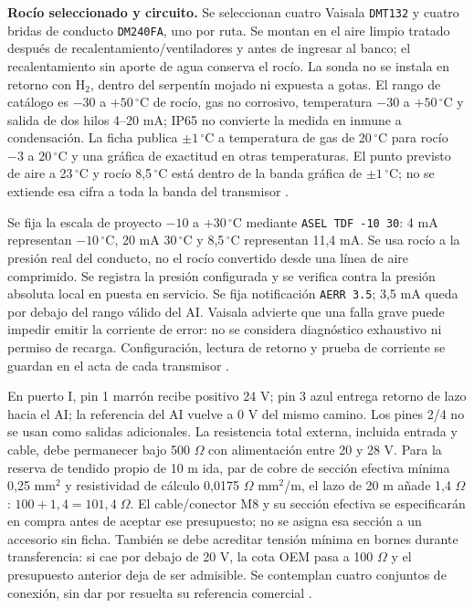 \textbf{Rocío seleccionado y circuito.} Se seleccionan cuatro Vaisala \texttt{DMT132} y cuatro bridas de conducto \texttt{DM240FA}, uno por ruta. Se montan en el aire limpio tratado después de recalentamiento/ventiladores y antes de ingresar al banco; el recalentamiento sin aporte de agua conserva el rocío. La sonda no se instala en retorno con H$_2$, dentro del serpentín mojado ni expuesta a gotas. El rango de catálogo es $-30$ a $+50\,^{\circ}$C de rocío, gas no corrosivo, temperatura $-30$ a $+50\,^{\circ}$C y salida de dos hilos 4--20 mA; IP65 no convierte la medida en inmune a condensación. La ficha publica $\pm1\,^{\circ}$C a temperatura de gas de 20\,$^{\circ}$C para rocío $-3$ a $20\,^{\circ}$C y una gráfica de exactitud en otras temperaturas. El punto previsto de aire a 23\,$^{\circ}$C y rocío 8,5\,$^{\circ}$C está dentro de la banda gráfica de $\pm1\,^{\circ}$C; no se extiende esa cifra a toda la banda del transmisor \parencite[pp.~1--2]{lote34-dmt-ficha}.

Se fija la escala de proyecto $-10$ a $+30\,^{\circ}$C mediante \texttt{ASEL TDF -10 30}: 4 mA representan $-10\,^{\circ}$C, 20 mA $30\,^{\circ}$C y 8,5\,$^{\circ}$C representan 11,4 mA. Se usa rocío a la presión real del conducto, no el rocío convertido desde una línea de aire comprimido. Se registra la presión configurada y se verifica contra la presión absoluta local en puesta en servicio. Se fija notificación \texttt{AERR 3.5}; 3,5 mA queda por debajo del rango válido del AI. Vaisala advierte que una falla grave puede impedir emitir la corriente de error: no se considera diagnóstico exhaustivo ni permiso de recarga. Configuración, lectura de retorno y prueba de corriente se guardan en el acta de cada transmisor \parencite{lote34-dmt-escala,lote34-dmt-error}.

En puerto I, pin 1 marrón recibe positivo 24 V; pin 3 azul entrega retorno de lazo hacia el AI; la referencia del AI vuelve a 0 V del mismo camino. Los pines 2/4 no se usan como salidas adicionales. La resistencia total externa, incluida entrada y cable, debe permanecer bajo 500 $\Omega$ con alimentación entre 20 y 28 V. Para la reserva de tendido propio de 10 m ida, par de cobre de sección efectiva mínima 0,25 mm$^2$ y resistividad de cálculo 0,0175 $\Omega$ mm$^2$/m, el lazo de 20 m añade 1,4 $\Omega$: $100+1,4=101,4\;\Omega$. El cable/conector M8 y su sección efectiva se especificarán en compra antes de aceptar ese presupuesto; no se asigna esa sección a un accesorio sin ficha. También se debe acreditar tensión mínima en bornes durante transferencia: si cae por debajo de 20 V, la cota OEM pasa a 100 $\Omega$ y el presupuesto anterior deja de ser admisible. Se contemplan cuatro conjuntos de conexión, sin dar por resuelta su referencia comercial \parencite[p.~2]{lote34-dmt-quick}.

